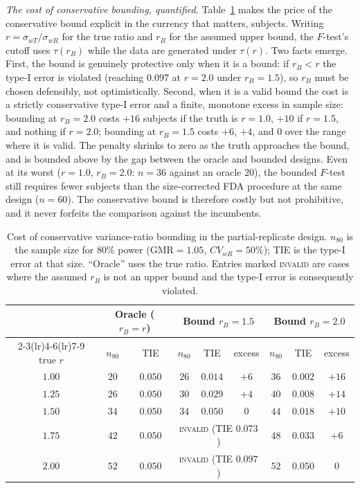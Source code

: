 \documentclass[11pt]{article}
\theoremstyle{remark}
\begin{document}
\emph{The cost of conservative bounding, quantified.} Table~\ref{tab:ratiocost} makes the price of the conservative bound explicit in the currency that matters, subjects. Writing $r=\sigma_{wT}/\sigma_{wR}$ for the true ratio and $r_B$ for the assumed upper bound, the $F$-test's cutoff uses $\tau(r_B)$ while the data are generated under $\tau(r)$. Two facts emerge. First, the bound is genuinely protective only when it is a bound: if $r_B<r$ the type-I error is violated (reaching $0.097$ at $r=2.0$ under $r_B=1.5$), so $r_B$ must be chosen defensibly, not optimistically. Second, when it is a valid bound the cost is a strictly conservative type-I error and a finite, monotone excess in sample size: bounding at $r_B=2.0$ costs $+16$ subjects if the truth is $r=1.0$, $+10$ if $r=1.5$, and nothing if $r=2.0$; bounding at $r_B=1.5$ costs $+6$, $+4$, and $0$ over the range where it is valid. The penalty shrinks to zero as the truth approaches the bound, and is bounded above by the gap between the oracle and bounded designs. Even at its worst ($r=1.0$, $r_B=2.0$: $n=36$ against an oracle $20$), the bounded $F$-test still requires fewer subjects than the size-corrected FDA procedure at the same design ($n=60$). The conservative bound is therefore costly but not prohibitive, and it never forfeits the comparison against the incumbents.

\begin{table}[t]
\centering
\caption{Cost of conservative variance-ratio bounding in the partial-replicate design. $n_{80}$ is the sample size for $80\%$ power ($\mathrm{GMR}=1.05$, $CV_{wR}=50\%$); TIE is the type-I error at that size. ``Oracle'' uses the true ratio. Entries marked \textsc{invalid} are cases where the assumed $r_B$ is not an upper bound and the type-I error is consequently violated.}
\label{tab:ratiocost}
\begin{tabular}{ccccccccc}
\toprule
 & \multicolumn{2}{c}{Oracle ($r_B=r$)} & \multicolumn{3}{c}{Bound $r_B=1.5$} & \multicolumn{3}{c}{Bound $r_B=2.0$} \\
\cmidrule(lr){2-3}\cmidrule(lr){4-6}\cmidrule(lr){7-9}
true $r$ & $n_{80}$ & TIE & $n_{80}$ & TIE & excess & $n_{80}$ & TIE & excess \\
\midrule
$1.00$ & $20$ & $0.050$ & $26$ & $0.014$ & $+6$  & $36$ & $0.002$ & $+16$ \\
$1.25$ & $26$ & $0.050$ & $30$ & $0.029$ & $+4$  & $40$ & $0.008$ & $+14$ \\
$1.50$ & $34$ & $0.050$ & $34$ & $0.050$ & $0$   & $44$ & $0.018$ & $+10$ \\
$1.75$ & $42$ & $0.050$ & \multicolumn{3}{c}{\textsc{invalid} (TIE $0.073$)} & $48$ & $0.033$ & $+6$ \\
$2.00$ & $52$ & $0.050$ & \multicolumn{3}{c}{\textsc{invalid} (TIE $0.097$)} & $52$ & $0.050$ & $0$ \\
\bottomrule
\end{tabular}
\end{table}
\end{document}
